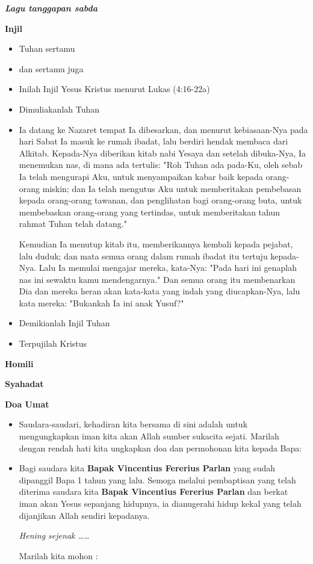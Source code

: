 \documentclass[titlepage,10pt,openany]{scrbook}
\makeatletter
\newcommand{\subjudul}[1]{%
  {\parindent \z@ 
    \interlinepenalty\@M \bfseries #1\par\nobreak \vskip 10\p@ }}
\newcommand{\lagu}[1]{%
  {\parindent \z@ 
    \interlinepenalty\@M \slshape \bfseries \normalsize \textit{#1}\par\nobreak \vskip 10\p@ }}
\newcommand{\BU}[1]{\begin{itemize} \item[U:] #1 \end{itemize}}
\newcommand{\BI}[1]{\begin{itemize} \item[I:] #1 \end{itemize}}
\newcommand{\BP}[1]{\begin{itemize} \item[P:] #1 \end{itemize}}
\newcommand{\namaalm}{Bapak Vincentius Fererius Parlan }
\makeatother
\begin{document}
 

\lagu{Lagu tanggapan sabda}
 

\subjudul{Injil}

\BI{Tuhan sertamu}

\BU{dan sertamu juga} 

\BI{Inilah Injil Yesus Kristus menurut Lukas (4:16-22a)}

\BU{Dimuliakanlah Tuhan}

\BI{Ia datang ke Nazaret tempat Ia dibesarkan, dan menurut kebiasaan-Nya pada hari Sabat Ia masuk ke rumah ibadat, lalu berdiri hendak membaca dari Alkitab.
Kepada-Nya diberikan kitab nabi Yesaya dan setelah dibuka-Nya, Ia menemukan nas, di mana ada tertulis:
"Roh Tuhan ada pada-Ku, oleh sebab Ia telah mengurapi Aku, untuk menyampaikan kabar baik kepada orang-orang miskin; dan Ia telah mengutus Aku
untuk memberitakan pembebasan kepada orang-orang tawanan, dan penglihatan bagi orang-orang buta, untuk membebaskan orang-orang yang tertindas, untuk memberitakan tahun rahmat Tuhan telah datang."

Kemudian Ia menutup kitab itu, memberikannya kembali kepada pejabat, lalu duduk; dan mata semua orang dalam rumah ibadat itu tertuju kepada-Nya.
Lalu Ia memulai mengajar mereka, kata-Nya: "Pada hari ini genaplah nas ini sewaktu kamu mendengarnya." Dan semua orang itu membenarkan Dia dan mereka heran akan kata-kata yang indah yang diucapkan-Nya, lalu kata mereka: "Bukankah Ia ini anak Yusuf?"
}


\BI{Demikianlah Injil Tuhan}

\BU{Terpujilah Kristus}

 

\subjudul{Homili}

\subjudul{Syahadat} 

\subjudul{Doa Umat}

\BI{Saudara-saudari, kehadiran kita bersama di sini adalah untuk mengungkapkan iman kita akan Allah sumber sukacita sejati. Marilah dengan rendah hati kita ungkapkan doa dan permohonan kita kepada Bapa:}
\BP{Bagi saudara kita \textbf{\namaalm} yang sudah dipanggil Bapa 1 
tahun yang lalu. Semoga melalui pembaptisan yang telah
diterima saudara kita \textbf{\namaalm} dan berkat iman akan Yesus
sepanjang hidupnya, ia dianugerahi hidup kekal yang
telah dijanjikan Allah sendiri kepadanya.

\textit{Hening sejenak \ldots\ldots} 

Marilah kita mohon :}
\end{document}
